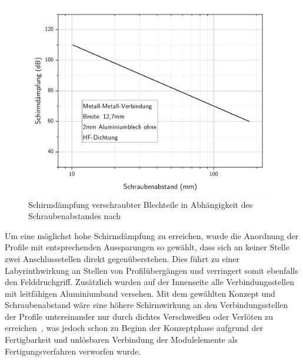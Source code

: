 \begin{figure}[ht]
    \centering
    \includegraphics[page = 1, trim = 0cm 0cm 0cm 0cm, clip, width=.65\textwidth]{Abbildungen/Kapitel3/Schraubenabstand_Schirmwirkung.pdf}
    \caption[Schirmdämpfung verschraubter Blechteile in Abhängigkeit des Schraubenabstandes]{Schirmdämpfung verschraubter Blechteile in Abhängigkeit des Schraubenabstandes nach~\cite{Design_of_shielded_enclosures}}
    \label{fig:3_Schirmwirkung_Schraubenabstand}
\end{figure}

\par
\vspace{\linespace}
Um eine möglichst hohe Schirmdämpfung zu erreichen, wurde die Anordnung der Profile mit entsprechenden Aussparungen so gewählt, dass sich an keiner Stelle zwei Anschlussstellen direkt gegenüberstehen. Dies führt zu einer Labyrinthwirkung an Stellen von Profilübergängen und verringert somit ebenfalls den Felddruchgriff. Zusätzlich wurden auf der Innenseite alle Verbindungsstellen mit leitfähigen Aluminiumband versehen. Mit dem gewählten Konzept und Schraubenabstand wäre eine höhere Schirmwirkung an den Verbindungsstellen der Profile untereinander nur durch dichtes Verschweißen oder Verlöten zu erreichen~\cite{Design_of_shielded_enclosures, EM_Schirmung}, was jedoch schon zu Beginn der Konzeptphase aufgrund der Fertigbarkeit und unlösbaren Verbindung der Modulelemente als Fertigungsverfahren verworfen wurde. 
\par
\vspace{\linespace}


    

